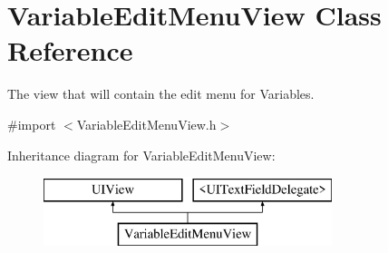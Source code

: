 \hypertarget{interface_variable_edit_menu_view}{\section{Variable\-Edit\-Menu\-View Class Reference}
\label{interface_variable_edit_menu_view}
}


The view that will contain the edit menu for Variables.  




{\ttfamily \#import $<$Variable\-Edit\-Menu\-View.\-h$>$}

Inheritance diagram for Variable\-Edit\-Menu\-View\-:\begin{figure}[H]
\begin{center}
\leavevmode
\includegraphics[height=2.000000cm]{interface_variable_edit_menu_view}
\end{center}
\end{figure}
